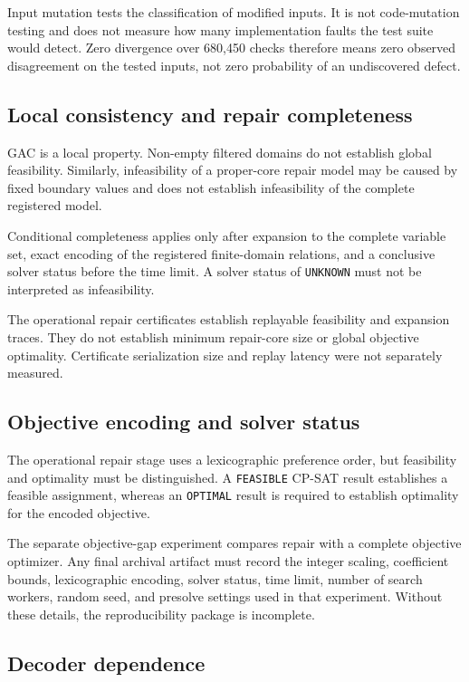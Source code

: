 \documentclass[pdflatex,sn-mathphys-num,iicol,oneside]{sn-jnl}
\newcommand{\gac}{\textsc{GAC}\xspace}
\newcommand{\cpsat}{\textsc{CP-SAT}\xspace}
\begin{document}
Input mutation tests the classification of modified inputs. It is not
code-mutation testing and does not measure how many implementation
faults the test suite would detect. Zero divergence over 680{,}450
checks therefore means zero observed disagreement on the tested
inputs, not zero probability of an undiscovered defect.

\subsection{Local consistency and repair completeness}

\gac is a local property. Non-empty filtered domains do not establish
global feasibility. Similarly, infeasibility of a proper-core repair
model may be caused by fixed boundary values and does not establish
infeasibility of the complete registered model.

Conditional completeness applies only after expansion to the complete
variable set, exact encoding of the registered finite-domain
relations, and a conclusive solver status before the time limit.
A solver status of \texttt{UNKNOWN} must not be interpreted as
infeasibility.

The operational repair certificates establish replayable feasibility
and expansion traces. They do not establish minimum repair-core size
or global objective optimality. Certificate serialization size and
replay latency were not separately measured.

\subsection{Objective encoding and solver status}

The operational repair stage uses a lexicographic preference order,
but feasibility and optimality must be distinguished. A
\texttt{FEASIBLE} \cpsat result establishes a feasible assignment,
whereas an \texttt{OPTIMAL} result is required to establish
optimality for the encoded objective.

The separate objective-gap experiment compares repair with a complete
objective optimizer. Any final archival artifact must record the
integer scaling, coefficient bounds, lexicographic encoding, solver
status, time limit, number of search workers, random seed, and
presolve settings used in that experiment. Without these details,
the reproducibility package is incomplete.

\subsection{Decoder dependence}
\end{document}
